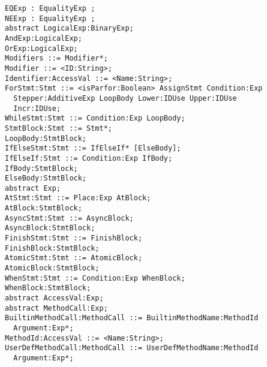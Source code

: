 \begin{lstlisting}
EQExp : EqualityExp ;                                                         
NEExp : EqualityExp ;
abstract LogicalExp:BinaryExp;
AndExp:LogicalExp;
OrExp:LogicalExp;
Modifiers ::= Modifier*;                                                        
Modifier ::= <ID:String>;     
Identifier:AccessVal ::= <Name:String>;
ForStmt:Stmt ::= <isParfor:Boolean> AssignStmt Condition:Exp
  Stepper:AdditiveExp LoopBody Lower:IDUse Upper:IDUse
  Incr:IDUse;
WhileStmt:Stmt ::= Condition:Exp LoopBody;
StmtBlock:Stmt ::= Stmt*;
LoopBody:StmtBlock;
IfElseStmt:Stmt ::= IfElseIf* [ElseBody];
IfElseIf:Stmt ::= Condition:Exp IfBody;
IfBody:StmtBlock;
ElseBody:StmtBlock;
abstract Exp;
AtStmt:Stmt ::= Place:Exp AtBlock;
AtBlock:StmtBlock;
AsyncStmt:Stmt ::= AsyncBlock;
AsyncBlock:StmtBlock;
FinishStmt:Stmt ::= FinishBlock;
FinishBlock:StmtBlock;
AtomicStmt:Stmt ::= AtomicBlock;
AtomicBlock:StmtBlock;
WhenStmt:Stmt ::= Condition:Exp WhenBlock;
WhenBlock:StmtBlock;
abstract AccessVal:Exp;
abstract MethodCall:Exp;
BuiltinMethodCall:MethodCall ::= BuiltinMethodName:MethodId
  Argument:Exp*;
MethodId:AccessVal ::= <Name:String>;
UserDefMethodCall:MethodCall ::= UserDefMethodName:MethodId
  Argument:Exp*;

\end{lstlisting}
